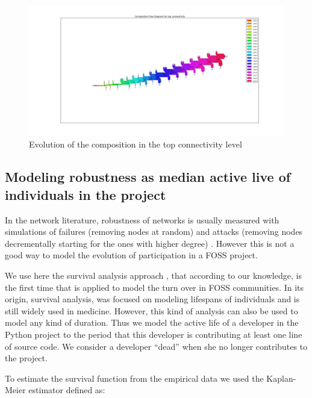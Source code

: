 \begin{landscape}
\begin{figure}[p]
\begin{center}
\includegraphics[scale=0.4]{figures/sankey_python}
\caption[Sankey diagram of the composition of each connectivity level.]{Evolution of the composition in the top connectivity level}
\label{fig:sankey}
\end{center}
\end{figure}
\end{landscape}


\subsection{Modeling robustness as median active live of individuals in the project}

In the network literature, robustness of networks is usually measured with simulations of failures (removing nodes at random) and attacks (removing nodes decrementally starting for the ones with higher degree) \citep{albert:2000}. However this is not a good way to model the evolution of participation in a FOSS project.

We use here the survival analysis approach \citep{miller:2011}, that according to our knowledge, is the first time that is applied to model the turn over in FOSS communities. In its origin, survival analysis, was focused on modeling lifespans of individuals and is still widely used in medicine. However, this kind of analysis can also be used to model any kind of duration. Thus we model the active life of a developer in the Python project to the period that this developer is contributing at least one line of source code. We consider a developer ``dead'' when she no longer contributes to the project.

To estimate the survival function from the empirical data we used the Kaplan-Meier estimator \citep{kaplan:1958} defined as:


